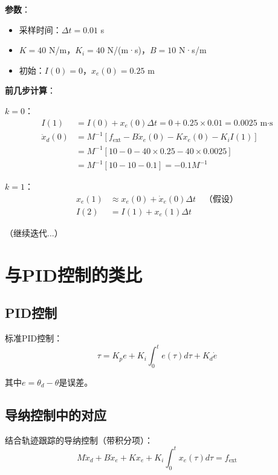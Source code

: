 \documentclass[12pt,a4paper]{article}
\begin{document}
\textbf{参数}：
\begin{itemize}
\item 采样时间：$\Delta t = 0.01$ s
\item $K = 40$ N/m，$K_i = 40$ N/(m·s)，$B = 10$ N·s/m
\item 初始：$I(0) = 0$，$x_e(0) = 0.25$ m
\end{itemize}

\textbf{前几步计算}：

$k = 0$：
\begin{align}
I(1) &= I(0) + x_e(0) \Delta t = 0 + 0.25 \times 0.01 = 0.0025 \text{ m·s} \\
\ddot{x}_d(0) &= M^{-1}[f_{\text{ext}} - B\dot{x}_e(0) - Kx_e(0) - K_i I(1)] \\
              &= M^{-1}[10 - 0 - 40 \times 0.25 - 40 \times 0.0025] \\
              &= M^{-1}[10 - 10 - 0.1] = -0.1M^{-1}
\end{align}

$k = 1$：
\begin{align}
x_e(1) &\approx x_e(0) + \dot{x}_e(0) \Delta t \quad \text{（假设）} \\
I(2) &= I(1) + x_e(1) \Delta t
\end{align}

（继续迭代...）

\section{与PID控制的类比}

\subsection{PID控制}

标准PID控制：
\begin{equation}
\tau = K_p e + K_i \int_0^t e(\tau) d\tau + K_d \dot{e}
\end{equation}

其中$e = \theta_d - \theta$是误差。

\subsection{导纳控制中的对应}

结合轨迹跟踪的导纳控制（带积分项）：
\begin{equation}
M\ddot{x}_d + B\dot{x}_e + Kx_e + K_i \int_0^t x_e(\tau) d\tau = f_{\text{ext}}
\end{equation}
\end{document}
